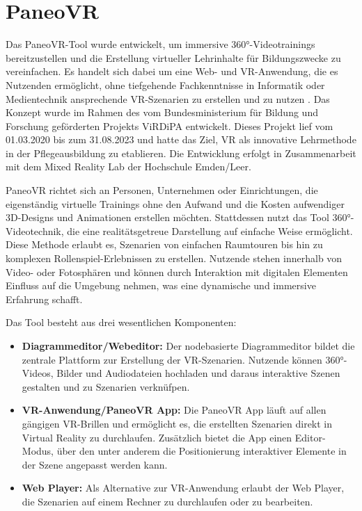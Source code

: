 \section{PaneoVR}

Das PaneoVR-Tool wurde entwickelt, um immersive 360°-Videotrainings bereitzustellen und die Erstellung virtueller Lehrinhalte für Bildungszwecke zu vereinfachen. Es handelt sich dabei um eine Web- und VR-Anwendung, die es Nutzenden ermöglicht, ohne tiefgehende Fachkenntnisse in Informatik oder Medientechnik ansprechende VR-Szenarien zu erstellen und zu nutzen \citep{noauthor_paneovr_nodate}. Das Konzept wurde im Rahmen des vom Bundesministerium für Bildung und Forschung geförderten Projekts ViRDiPA \citep{noauthor_virdipa-_nodate} entwickelt. Dieses Projekt lief vom 01.03.2020 bis zum 31.08.2023 und hatte das Ziel, VR als innovative Lehrmethode in der Pflegeausbildung zu etablieren. Die Entwicklung erfolgt in Zusammenarbeit mit dem Mixed Reality Lab der Hochschule Emden/Leer.

PaneoVR richtet sich an Personen, Unternehmen oder Einrichtungen, die eigenständig virtuelle Trainings ohne den Aufwand und die Kosten aufwendiger 3D-Designs und Animationen erstellen möchten. Stattdessen nutzt das Tool 360°-Videotechnik, die eine realitätsgetreue Darstellung auf einfache Weise ermöglicht. Diese Methode erlaubt es, Szenarien von einfachen Raumtouren bis hin zu komplexen Rollenspiel-Erlebnissen zu erstellen. Nutzende stehen innerhalb von Video- oder Fotosphären und können durch Interaktion mit digitalen Elementen Einfluss auf die Umgebung nehmen, was eine dynamische und immersive Erfahrung schafft.

Das Tool besteht aus drei wesentlichen Komponenten:

\begin{itemize}
    \item \textbf{Diagrammeditor/Webeditor:}
    Der nodebasierte Diagrammeditor bildet die zentrale Plattform zur Erstellung der VR-Szenarien. Nutzende können 360°-Videos, Bilder und Audiodateien hochladen und daraus interaktive Szenen gestalten und zu Szenarien verknüfpen. 
    \item \textbf{VR-Anwendung/PaneoVR App:}
    Die PaneoVR App läuft auf allen gängigen VR-Brillen und ermöglicht es, die erstellten Szenarien direkt in Virtual Reality zu durchlaufen. Zusätzlich bietet die App einen Editor-Modus, über den unter anderem die Positionierung interaktiver Elemente in der Szene angepasst werden kann. 
    \item \textbf{Web Player:}
    Als Alternative zur VR-Anwendung erlaubt der Web Player, die Szenarien auf einem Rechner zu durchlaufen oder zu bearbeiten.
\end{itemize}

